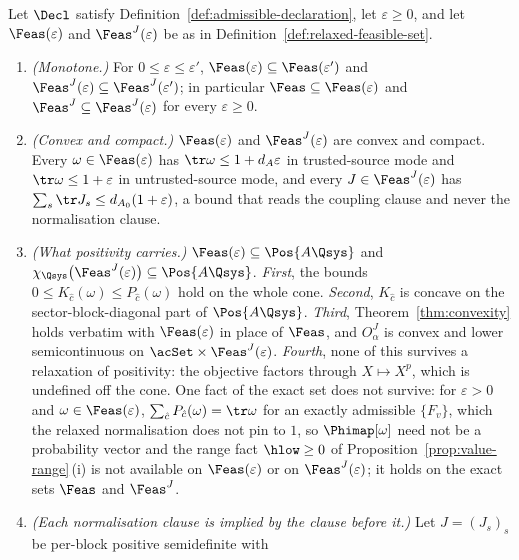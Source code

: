 \begin{proposition}\label{prop:relaxed-set-properties}
Let $\Decl$ satisfy Definition~\ref{def:admissible-declaration}, let $\varepsilon\ge0$, and
let $\Feas(\varepsilon)$ and $\Feas^{J}(\varepsilon)$ be as in
Definition~\ref{def:relaxed-feasible-set}.
\begin{enumerate}[label=(\alph*),leftmargin=2.4em]
\item \emph{(Monotone.)} For $0\le\varepsilon\le\varepsilon'$,
  $\Feas(\varepsilon)\subseteq\Feas(\varepsilon')$ and
  $\Feas^{J}(\varepsilon)\subseteq\Feas^{J}(\varepsilon')$; in particular
  $\Feas\subseteq\Feas(\varepsilon)$ and $\Feas^{J}\subseteq\Feas^{J}(\varepsilon)$
  for every $\varepsilon\ge0$.
\item \emph{(Convex and compact.)} $\Feas(\varepsilon)$ and
  $\Feas^{J}(\varepsilon)$ are convex and compact. Every
  $\omega\in\Feas(\varepsilon)$ has $\tr\omega\le1+d_A\varepsilon$ in
  trusted-source mode and $\tr\omega\le1+\varepsilon$ in untrusted-source
  mode, and every $J\in\Feas^{J}(\varepsilon)$ has
  $\sum_s\tr J_s\le d_{A_0}(1+\varepsilon)$, a bound that reads the coupling
  clause and never the normalisation clause.
\item \emph{(What positivity carries.)} $\Feas(\varepsilon)\subseteq\Pos{A\Qsys}$
  and $\chi_{\Qsys}\big(\Feas^{J}(\varepsilon)\big)\subseteq\Pos{A\Qsys}$.
  \emph{First}, the bounds $0\le K_{\hat c}(\omega)\le P_{\hat c}(\omega)$
  hold on the whole cone. \emph{Second}, $K_{\hat c}$ is concave on the
  sector-block-diagonal part of $\Pos{A\Qsys}$. \emph{Third},
  Theorem~\ref{thm:convexity} holds verbatim with $\Feas(\varepsilon)$ in
  place of $\Feas$, and $O^{J}_{\alpha}$ is convex and lower semicontinuous
  on $\acSet\times\Feas^{J}(\varepsilon)$. \emph{Fourth}, none of this
  survives a relaxation of positivity: the objective factors through
  $X\mapsto X^{p}$, which is undefined off the cone. One fact of the exact
  set does not survive: for $\varepsilon>0$ and $\omega\in\Feas(\varepsilon)$,
  $\sum_{\hat c}P_{\hat c}(\omega)=\tr\omega$ for an exactly admissible
  $\{F_v\}$, which the relaxed
  normalisation does not pin to $1$, so $\Phimap[\omega]$ need not be a
  probability vector and the range fact $\hlow\ge0$ of
  Proposition~\ref{prop:value-range}\,(i) is not available on
  $\Feas(\varepsilon)$ or on $\Feas^{J}(\varepsilon)$; it holds on the exact
  sets $\Feas$ and $\Feas^{J}$.
\item[(c$'$)] \emph{(Each normalisation clause is implied by the clause
  before it.)} Let $J=(J_s)_s$ be per-block positive semidefinite with

\end{enumerate}
\end{proposition}
